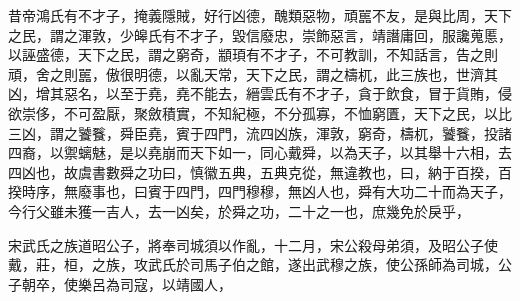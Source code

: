 \documentclass[fontset = none]{ctexart}
\begin{document}
昔帝鴻氏有不才子，掩義隱賊，好行凶德，醜類惡物，頑嚚不友，是與比周，天下之民，謂之渾敦，少皞氏有不才子，毀信廢忠，崇飾惡言，靖譖庸回，服讒蒐慝，以誣盛德，天下之民，謂之窮奇，顓頊有不才子，不可教訓，不知話言，告之則頑，舍之則嚚，傲很明德，以亂天常，天下之民，謂之檮杌，此三族也，世濟其凶，增其惡名，以至于堯，堯不能去，縉雲氏有不才子，貪于飲食，冒于貨賄，侵欲崇侈，不可盈厭，聚斂積實，不知紀極，不分孤寡，不恤窮匱，天下之民，以比三凶，謂之饕餮，舜臣堯，賓于四門，流四凶族，渾敦，窮奇，檮杌，饕餮，投諸四裔，以禦螭魅，是以堯崩而天下如一，同心戴舜，以為天子，以其舉十六相，去四凶也，故虞書數舜之功曰，慎徽五典，五典克從，無違教也，曰，納于百揆，百揆時序，無廢事也，曰賓于四門，四門穆穆，無凶人也，舜有大功二十而為天子，今行父雖未獲一吉人，去一凶矣，於舜之功，二十之一也，庶幾免於戾乎，

宋武氏之族道昭公子，將奉司城須以作亂，十二月，宋公殺母弟須，及昭公子使戴，莊，桓，之族，攻武氏於司馬子伯之館，遂出武穆之族，使公孫師為司城，公子朝卒，使樂呂為司寇，以靖國人，
\end{document}
